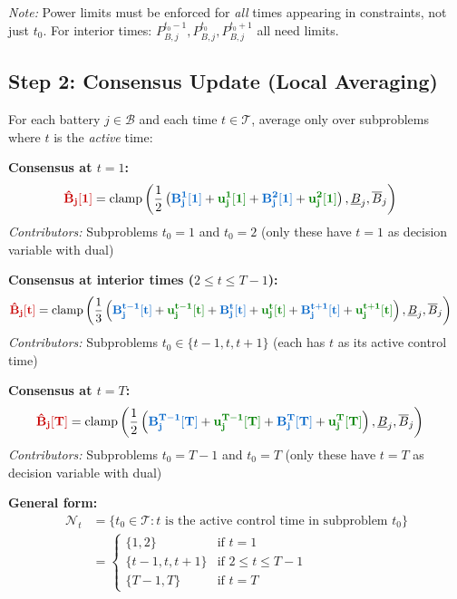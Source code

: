 \documentclass[11pt]{article}
\newcommand{\blueB}[1]{\textcolor{bluevar}{\mathbf{#1}}}      %
\newcommand{\redBhat}[1]{\textcolor{redvar}{\mathbf{#1}}}     %
\newcommand{\greenu}[1]{\textcolor{greenvar}{\mathbf{#1}}}    %
\begin{document}
\textit{Note:} Power limits must be enforced for \textit{all} times appearing in constraints, not just $t_0$. For interior times: $P_{B,j}^{t_0-1}, P_{B,j}^{t_0}, P_{B,j}^{t_0+1}$ all need limits.

\subsection{Step 2: Consensus Update (Local Averaging)}

For each battery $j \in \mathcal{B}$ and each time $t \in \mathcal{T}$, average only over subproblems where $t$ is the \textit{active} time:

\noindent\textbf{Consensus at $t=1$:}
\begin{align}
\redBhat{\hat{B}_j[1]} &= \text{clamp}\left( \frac{1}{2} \left( \blueB{B_j^{1}[1]} + \greenu{u_j^{1}[1]} + \blueB{B_j^{2}[1]} + \greenu{u_j^{2}[1]} \right), \underline{B}_j, \overline{B}_j \right)
\end{align}
\textit{Contributors:} Subproblems $t_0=1$ and $t_0=2$ (only these have $t=1$ as decision variable with dual)

\noindent\textbf{Consensus at interior times ($2 \leq t \leq T-1$):}
\begin{align}
\redBhat{\hat{B}_j[t]} &= \text{clamp}\left( \frac{1}{3} \left( \blueB{B_j^{t-1}[t]} + \greenu{u_j^{t-1}[t]} + \blueB{B_j^{t}[t]} + \greenu{u_j^{t}[t]} + \blueB{B_j^{t+1}[t]} + \greenu{u_j^{t+1}[t]} \right), \underline{B}_j, \overline{B}_j \right)
\end{align}
\textit{Contributors:} Subproblems $t_0 \in \{t-1, t, t+1\}$ (each has $t$ as its active control time)

\noindent\textbf{Consensus at $t=T$:}
\begin{align}
\redBhat{\hat{B}_j[T]} &= \text{clamp}\left( \frac{1}{2} \left( \blueB{B_j^{T-1}[T]} + \greenu{u_j^{T-1}[T]} + \blueB{B_j^{T}[T]} + \greenu{u_j^{T}[T]} \right), \underline{B}_j, \overline{B}_j \right)
\end{align}
\textit{Contributors:} Subproblems $t_0=T-1$ and $t_0=T$ (only these have $t=T$ as decision variable with dual)

\textbf{General form:}
\begin{align}
\mathcal{N}_t &= \{t_0 \in \mathcal{T} : t \text{ is the active control time in subproblem } t_0\} \\
&= \begin{cases}
\{1, 2\} & \text{if } t = 1 \\
\{t-1, t, t+1\} & \text{if } 2 \leq t \leq T-1 \\
\{T-1, T\} & \text{if } t = T
\end{cases}
\end{align}
\end{document}
